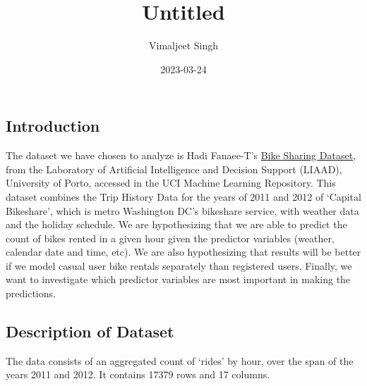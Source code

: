 \documentclass[
]{article}
\title{Untitled}
\author{Vimaljeet Singh}
\date{2023-03-24}
\begin{document}
\maketitle

\hypertarget{introduction}{%
\subsection{Introduction}\label{introduction}}

The dataset we have chosen to analyze is Hadi Fanaee-T's
\href{https://archive.ics.uci.edu/ml/datasets/Bike+Sharing+Dataset}{Bike
Sharing Dataset}, from the Laboratory of Artificial Intelligence and
Decision Support (LIAAD), University of Porto, accessed in the UCI
Machine Learning Repository. This dataset combines the Trip History Data
for the years of 2011 and 2012 of `Capital Bikeshare', which is metro
Washington DC's bikeshare service, with weather data and the holiday
schedule. We are hypothesizing that we are able to predict the count of
bikes rented in a given hour given the predictor variables (weather,
calendar date and time, etc). We are also hypothesizing that results
will be better if we model casual user bike rentals separately than
registered users. Finally, we want to investigate which predictor
variables are most important in making the predictions.

\hypertarget{description-of-dataset}{%
\subsection{Description of Dataset}\label{description-of-dataset}}

The data consists of an aggregated count of `rides' by hour, over the
span of the years 2011 and 2012. It contains 17379 rows and 17 columns.
\end{document}

